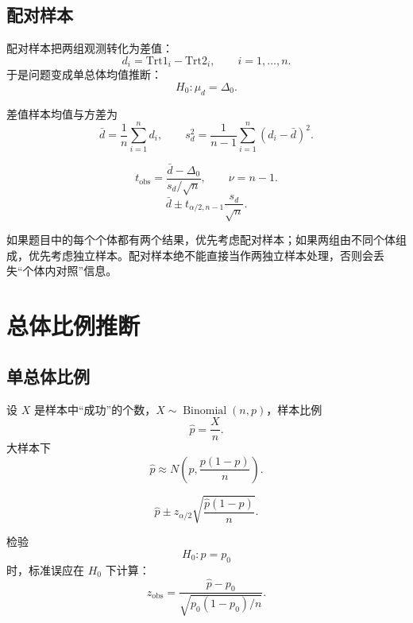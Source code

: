 \documentclass[11pt,a4paper]{article}
\theoremstyle{definition}
\theoremstyle{plain}
\theoremstyle{remark}
\begin{document}
\subsection{配对样本}

配对样本把两组观测转化为差值：
\[
    d_i=\text{Trt1}_i-\text{Trt2}_i,\qquad i=1,\ldots,n.
\]
于是问题变成单总体均值推断：
\[
    H_0:\mu_d=\Delta_0.
\]

差值样本均值与方差为
\[
    \bar d=\frac{1}{n}\sum_{i=1}^n d_i,\qquad
    s_d^2=\frac{1}{n-1}\sum_{i=1}^n(d_i-\bar d)^2.
\]

\begin{memorybox}
\[
    \boxed{
    t_{\text{obs}}=\frac{\bar d-\Delta_0}{s_d/\sqrt n},
    \qquad \nu=n-1.
    }
\]
\[
    \boxed{
    \bar d\pm t_{\alpha/2,n-1}\frac{s_d}{\sqrt n}.
    }
\]
\end{memorybox}

\begin{methodbox}[独立样本与配对样本的快速识别]
如果题目中的每个个体都有两个结果，优先考虑配对样本；如果两组由不同个体组成，优先考虑独立样本。配对样本绝不能直接当作两独立样本处理，否则会丢失“个体内对照”信息。
\end{methodbox}

\section{总体比例推断}
\label{sec:proportions}

\subsection{单总体比例}

设 $X$ 是样本中“成功”的个数，$X\sim \operatorname{Binomial}(n,p)$，样本比例
\[
    \hat p=\frac{X}{n}.
\]
大样本下
\[
    \hat p\approx N\left(p,\frac{p(1-p)}{n}\right).
\]

\begin{memorybox}
\[
    \boxed{
    \hat p\pm z_{\alpha/2}
    \sqrt{\frac{\hat p(1-\hat p)}{n}}.
    }
\]
\end{memorybox}

\begin{memorybox}
检验
\[
    H_0:p=p_0
\]
时，标准误应在 $H_0$ 下计算：
\[
    \boxed{
    z_{\text{obs}}
    =
    \frac{\hat p-p_0}
    {\sqrt{p_0(1-p_0)/n}}.
    }
\]
\end{memorybox}
\end{document}
